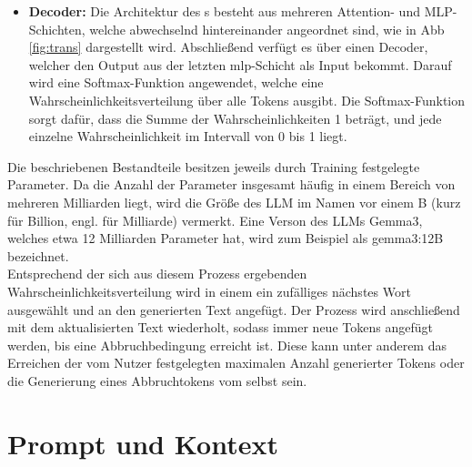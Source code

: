 \documentclass[../main.tex]{subfiles}
\begin{document}
\begin{itemize}
\item \textbf{Decoder:} Die Architektur des s besteht aus mehreren Attention- und MLP-Schichten, welche abwechselnd hintereinander angeordnet sind, wie in Abb \ref{fig:trans} dargestellt wird. Abschließend verfügt es über einen Decoder, welcher den Output aus der letzten \acrshort{mlp}-Schicht als Input bekommt. Darauf wird eine Softmax-Funktion angewendet, welche eine Wahrscheinlichkeitsverteilung über alle Tokens ausgibt. Die Softmax-Funktion sorgt dafür, dass die Summe der Wahrscheinlichkeiten 1 beträgt, und jede einzelne Wahrscheinlichkeit im Intervall von 0 bis 1 liegt.\cite{architecture} 
\end{itemize}

Die beschriebenen Bestandteile besitzen jeweils durch Training festgelegte Parameter. Da die Anzahl der Parameter insgesamt häufig in einem Bereich von mehreren Milliarden liegt, wird die Größe des LLM im Namen vor einem B (kurz für Billion, engl. für Milliarde) vermerkt. Eine Verson des LLMs Gemma3, welches etwa 12 Milliarden Parameter hat, wird zum Beispiel als gemma3:12B bezeichnet.\\

Entsprechend der sich aus diesem Prozess ergebenden Wahrscheinlichkeitsverteilung wird in einem  ein zufälliges nächstes Wort ausgewählt und an den generierten Text angefügt. 
Der Prozess wird anschließend mit dem aktualisierten Text wiederholt, sodass immer neue Tokens angefügt werden, bis eine Abbruchbedingung erreicht ist. Diese kann unter anderem das 
Erreichen der vom Nutzer festgelegten maximalen Anzahl generierter Tokens oder die Generierung eines Abbruchtokens vom  selbst sein.\cite{architecture}\\

\section{Prompt und Kontext}
\end{document}
